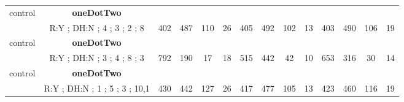 \begin{table}[]
{\begin{tabular}{|c|c|c|c|c|c|c|c|c|c|c|c|c|c|}
control & \cellcolor{blue!15}\textbf{oneDotTwo}& {\color[HTML]{00009B} } & {\color[HTML]{9A0000} } & {\color[HTML]{009901} } &  & {\color[HTML]{00009B} } & {\color[HTML]{9A0000} } & {\color[HTML]{009901} } &  & {\color[HTML]{00009B} } & {\color[HTML]{9A0000} } & {\color[HTML]{009901} } &  \\ 
 & \cellcolor{ blue!15}R:Y ; DH:N ; 4 ; 3 ; 2 ; 8 & \multirow{-2}{*}{{\color[HTML]{00009B} 402}} & \multirow{-2}{*}{{\color[HTML]{9A0000} 487}} & \multirow{-2}{*}{{\color[HTML]{009901} 110}} & \multirow{-2}{*}{26} & \multirow{-2}{*}{{\color[HTML]{00009B} 405}} & \multirow{-2}{*}{{\color[HTML]{9A0000} 492}} & \multirow{-2}{*}{{\color[HTML]{009901} 102}} & \multirow{-2}{*}{13} & \multirow{-2}{*}{{\color[HTML]{00009B} 403}} & \multirow{-2}{*}{{\color[HTML]{9A0000} 490}} & \multirow{-2}{*}{{\color[HTML]{009901} 106}} & \multirow{-2}{*}{19} \\ \hline

control & \cellcolor{blue!15}\textbf{oneDotTwo}& {\color[HTML]{00009B} } & {\color[HTML]{9A0000} } & {\color[HTML]{009901} } &  & {\color[HTML]{00009B} } & {\color[HTML]{9A0000} } & {\color[HTML]{009901} } &  & {\color[HTML]{00009B} } & {\color[HTML]{9A0000} } & {\color[HTML]{009901} } &  \\ 
 & \cellcolor{ blue!15}R:Y ; DH:N ; 3 ; 4 ; 8 ; 3 & \multirow{-2}{*}{{\color[HTML]{00009B} 792}} & \multirow{-2}{*}{{\color[HTML]{9A0000} 190}} & \multirow{-2}{*}{{\color[HTML]{009901} 17}} & \multirow{-2}{*}{18} & \multirow{-2}{*}{{\color[HTML]{00009B} 515}} & \multirow{-2}{*}{{\color[HTML]{9A0000} 442}} & \multirow{-2}{*}{{\color[HTML]{009901} 42}} & \multirow{-2}{*}{10} & \multirow{-2}{*}{{\color[HTML]{00009B} 653}} & \multirow{-2}{*}{{\color[HTML]{9A0000} 316}} & \multirow{-2}{*}{{\color[HTML]{009901} 30}} & \multirow{-2}{*}{14} \\ \hline

control & \cellcolor{blue!15}\textbf{oneDotTwo}& {\color[HTML]{00009B} } & {\color[HTML]{9A0000} } & {\color[HTML]{009901} } &  & {\color[HTML]{00009B} } & {\color[HTML]{9A0000} } & {\color[HTML]{009901} } &  & {\color[HTML]{00009B} } & {\color[HTML]{9A0000} } & {\color[HTML]{009901} } &  \\ 
 & \cellcolor{ blue!15}R:Y ; DH:N ; 1 ; 5 ; 3 ; 10,1 & \multirow{-2}{*}{{\color[HTML]{00009B} 430}} & \multirow{-2}{*}{{\color[HTML]{9A0000} 442}} & \multirow{-2}{*}{{\color[HTML]{009901} 127}} & \multirow{-2}{*}{26} & \multirow{-2}{*}{{\color[HTML]{00009B} 417}} & \multirow{-2}{*}{{\color[HTML]{9A0000} 477}} & \multirow{-2}{*}{{\color[HTML]{009901} 105}} & \multirow{-2}{*}{13} & \multirow{-2}{*}{{\color[HTML]{00009B} 423}} & \multirow{-2}{*}{{\color[HTML]{9A0000} 460}} & \multirow{-2}{*}{{\color[HTML]{009901} 116}} & \multirow{-2}{*}{19} \\ \hline


\end{tabular}}
\end{table}
